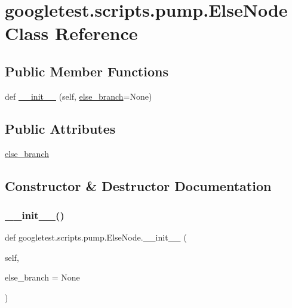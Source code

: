 \hypertarget{classgoogletest_1_1scripts_1_1pump_1_1_else_node}{}\section{googletest.\+scripts.\+pump.\+Else\+Node Class Reference}
\label{classgoogletest_1_1scripts_1_1pump_1_1_else_node}
\subsection*{Public Member Functions}
\begin{DoxyCompactItemize}
\item 
def \mbox{\hyperlink{classgoogletest_1_1scripts_1_1pump_1_1_else_node_a8daa266b483945589d934b2d9f415223}{\+\_\+\+\_\+init\+\_\+\+\_\+}} (self, \mbox{\hyperlink{classgoogletest_1_1scripts_1_1pump_1_1_else_node_a251194d9a9f9d045e963da94b44b5326}{else\+\_\+branch}}=None)
\end{DoxyCompactItemize}
\subsection*{Public Attributes}
\begin{DoxyCompactItemize}
\item 
\mbox{\hyperlink{classgoogletest_1_1scripts_1_1pump_1_1_else_node_a251194d9a9f9d045e963da94b44b5326}{else\+\_\+branch}}
\end{DoxyCompactItemize}


\subsection{Constructor \& Destructor Documentation}
\mbox{\label{classgoogletest_1_1scripts_1_1pump_1_1_else_node_a8daa266b483945589d934b2d9f415223}} 
\subsubsection{\texorpdfstring{\_\_init\_\_()}{\_\_init\_\_()}}
{\footnotesize\ttfamily def googletest.\+scripts.\+pump.\+Else\+Node.\+\_\+\+\_\+init\+\_\+\+\_\+ (\begin{DoxyParamCaption}\item[{}]{self,  }\item[{}]{else\+\_\+branch = {\ttfamily None} }\end{DoxyParamCaption})}



